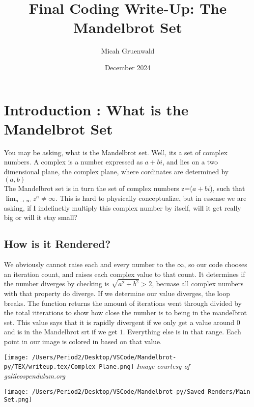 \documentclass{article}
\author{Micah Gruenwald}
\title{Final Coding Write-Up: The Mandelbrot Set}
\date{December 2024}
\begin{document}
\maketitle
\pagebreak
\section{Introduction : What is the Mandelbrot Set}
\begin{minipage}[t]{0.4\textwidth}
    You may be asking, what is the Mandelbrot set. Well, its a set of complex numbers. A complex is a number expressed as $a+bi$, and lies on a two dimensional plane, the complex plane, where cordinates are determined by $(a,b)$\\
    The Mandelbrot set is in turn the set of complex numbers z=($a+bi$), such that $\lim_{n\to\infty} z^n \neq  \infty$. This is hard to physically conceptualize, but in essense we are asking, if I indefinetly multiply this complex number by itself, will it get really big or will it stay small?
\subsection{How is it Rendered?}
We obviously cannot raise each and every number to the $\infty$, so our code chooses an iteration count, and raises each complex value to that count. It determines if the number diverges by checking is $\sqrt{a^2+b^2}>2$, becuase all complex numbers with that property do diverge. If we determine our value diverges, the loop breaks. The function returns the amount of iterations went through divided by the total itterations to show how close the number is to being in the mandelbrot set. This value says that it is rapidly divergent if we only get a value around $0$ and is in the Mandelbrot srt if we get $1$. Everything else is in that range. Each point in our image is colored in based on that value. 
\end{minipage}
\hspace{20pt}
\begin{minipage}[t]{0.4\textwidth}
    \texttt{[image: /Users/Period2/Desktop/VSCode/Mandelbrot-py/TEX/writeup.tex/Complex Plane.png]}
    \textit{Image courtesy of galileospendulum.org}

    \vspace{20pt}
    \texttt{[image: /Users/Period2/Desktop/VSCode/Mandelbrot-py/Saved Renders/Main Set.png]}
\end{minipage}
\pagebreak
\end{document}
